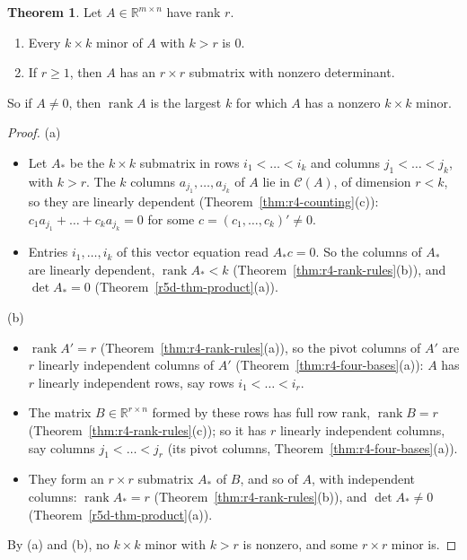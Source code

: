 \documentclass[12pt]{article}
\newcommand{\R}{\mathbb R}
\DeclareMathOperator{\rank}{rank}
\theoremstyle{definition}
\newtheorem{theorem}{Theorem}
\begin{document}
\begin{theorem}\label{r5d-thm-rank-minors}
Let \(A\in\R^{m\times n}\) have rank \(r\).
\begin{enumerate}
\item Every \(k\times k\) minor of \(A\) with \(k>r\) is \(0\).
\item If \(r\geqslant1\), then \(A\) has an \(r\times r\) submatrix with nonzero determinant.
\end{enumerate}
So if \(A\ne0\), then \(\rank A\) is the largest \(k\) for which \(A\) has a nonzero \(k\times k\) minor.
\end{theorem}
\begin{proof}
(a)
\begin{itemize}
\item Let \(A_*\) be the \(k\times k\) submatrix in rows \(i_1<\dots<i_k\) and columns \(j_1<\dots<j_k\), with \(k>r\). The
\(k\) columns \(a_{j_1},\dots,a_{j_k}\) of \(A\) lie in \(\mathcal C(A)\), of dimension \(r<k\), so they are linearly dependent
(Theorem~\ref{thm:r4-counting}(c)): \(c_1a_{j_1}+\dots+c_ka_{j_k}=0\) for some \(c=(c_1,\dots,c_k)'\ne0\).
\item Entries \(i_1,\dots,i_k\) of this vector equation read \(A_*c=0\). So the columns of \(A_*\) are linearly dependent,
\(\rank A_*<k\) (Theorem~\ref{thm:r4-rank-rules}(b)), and \(\det A_*=0\) (Theorem~\ref{r5d-thm-product}(a)).
\end{itemize}
(b)
\begin{itemize}
\item \(\rank A'=r\) (Theorem~\ref{thm:r4-rank-rules}(a)), so the pivot columns of \(A'\) are \(r\) linearly independent
columns of \(A'\) (Theorem~\ref{thm:r4-four-bases}(a)): \(A\) has \(r\) linearly independent rows, say rows
\(i_1<\dots<i_r\).
\item The matrix \(B\in\R^{r\times n}\) formed by these rows has full row rank, \(\rank B=r\)
(Theorem~\ref{thm:r4-rank-rules}(c)); so it has \(r\) linearly independent columns, say columns \(j_1<\dots<j_r\) (its pivot
columns, Theorem~\ref{thm:r4-four-bases}(a)).
\item They form an \(r\times r\) submatrix \(A_*\) of \(B\), and so of \(A\), with independent columns: \(\rank A_*=r\)
(Theorem~\ref{thm:r4-rank-rules}(b)), and \(\det A_*\ne0\) (Theorem~\ref{r5d-thm-product}(a)).
\end{itemize}
By (a) and (b), no \(k\times k\) minor with \(k>r\) is nonzero, and some \(r\times r\) minor is.
\end{proof}
\end{document}

